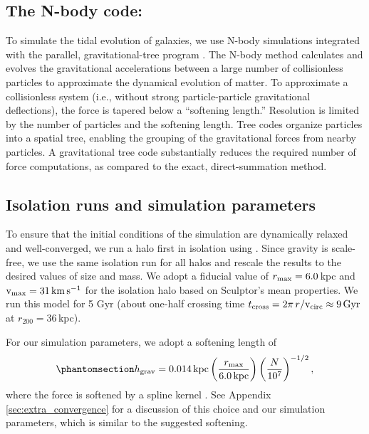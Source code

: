 \subsection{\texorpdfstring{The N-body code:
\gadget{}}{The N-body code: }}\label{the-n-body-code}

To simulate the tidal evolution of galaxies, we use N-body simulations
integrated with the parallel, gravitational-tree program \gadget{}
\citep{gadget4}. The N-body method calculates and evolves the
gravitational accelerations between a large number of collisionless
particles to approximate the dynamical evolution of matter. To
approximate a collisionless system (i.e., without strong
particle-particle gravitational deflections), the force is tapered below
a ``softening length.'' Resolution is limited by the number of particles
and the softening length. Tree codes organize particles into a spatial
tree, enabling the grouping of the gravitational forces from nearby
particles. A gravitational tree code substantially reduces the required
number of force computations, as compared to the exact, direct-summation
method.

\subsection{Isolation runs and simulation
parameters}\label{isolation-runs-and-simulation-parameters}

To ensure that the initial conditions of the simulation are dynamically
relaxed and well-converged, we run a halo first in isolation using
\gadget{}. Since gravity is scale-free, we use the same isolation run
for all halos and rescale the results to the desired values of size and
mass. We adopt a fiducial value of \(r_{\rm max} = 6.0\,\)kpc and
\({\rm v}_{\rm max} = 31\,{\rm km\,s^{-1}}\) for the isolation halo based on Sculptor's mean
properties. We run this model for 5 Gyr (about one-half crossing time
\(t_{\rm cross} = 2\pi\,r /{\rm v}_{\rm circ}  \approx 9\,{\rm Gyr}\) at
\(r_{200}=36\,\)kpc).

For our simulation parameters, we adopt a softening length of
\begin{equation}\protect\phantomsection\label{eq:softening_length}{
h_{\rm grav} = 0.014\,{\rm kpc}\left(\frac{r_{\rm max}}{6.0\,{\rm kpc}}\right)\left(\frac{N}{10^7}\right)^{-1/2},
}\end{equation} where the force is softened by a spline kernel
\citetext{\citealp[eqs. 70--71
in][]{springel+yoshida+white2001}; \citealp[but with the spline
characteristic radius \(2.8h_{\rm grav}\), see][]{gadget4}}. See
Appendix \ref{sec:extra_convergence} for a discussion of this choice and
our simulation parameters, which is similar to the \citet{power+2003}
suggested softening.

